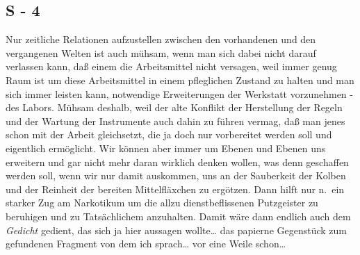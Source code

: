 \documentclass[
]{article}
\author{}
\date{\vspace{-2.5em}}
\begin{document}
\subsection{S - 4}\label{s---4}

Nur zeitliche Relationen aufzustellen zwischen den vorhandenen und den
vergangenen Welten ist auch mühsam, wenn man sich dabei nicht darauf
verlassen kann, daß einem die Arbeitsmittel nicht versagen, weil immer
genug Raum ist um diese Arbeitsmittel in einem pfleglichen Zustand zu
halten und man sich immer leisten kann, notwendige Erweiterungen der
Werkstatt vorzunehmen - des Labors. Mühsam deshalb, weil der alte
Konflikt der Herstellung der Regeln und der Wartung der Instrumente auch
dahin zu führen vermag, daß man jenes schon mit der Arbeit gleichsetzt,
die ja doch nur vorbereitet werden soll und eigentlich ermöglicht. Wir
können aber immer um Ebenen und Ebenen uns erweitern und gar nicht mehr
daran wirklich denken wollen, was denn geschaffen werden soll, wenn wir
nur damit auskommen, uns an der Sauberkeit der Kolben und der Reinheit
der bereiten Mittelfläxchen zu ergötzen. Dann hilft nur n.~ein starker
Zug am Narkotikum um die allzu dienstbeflissenen Putzgeister zu
beruhigen und zu Tatsächlichem anzuhalten. Damit wäre dann endlich auch
dem \emph{Gedicht} gedient, das sich ja hier aussagen wollte\ldots{} das
papierne Gegenstück zum gefundenen Fragment von dem ich sprach\ldots{}
vor eine Weile schon\ldots{}
\end{document}
